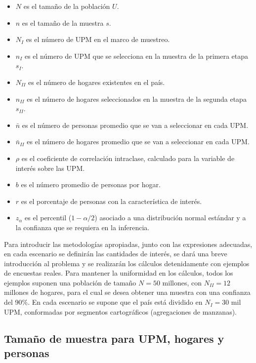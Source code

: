 \documentclass[
  10pt,
  spanish,
]{book}
\providecommand{\tightlist}{%
  \setlength{\itemsep}{0pt}\setlength{\parskip}{0pt}}
\begin{document}
\begin{itemize}
\tightlist
\item
  \(N\) es el tamaño de la población \(U\).
\item
  \(n\) es el tamaño de la muestra \(s\).
\item
  \(N_{I}\) es el número de UPM en el marco de muestreo.
\item
  \(n_{I}\) es el número de UPM que se selecciona en la muestra de la primera etapa \(s_I\).
\item
  \(N_{II}\) es el número de hogares existentes en el país.
\item
  \(n_{II}\) es el número de hogares seleccionados en la muestra de la segunda etapa \(s_{II}\).
\item
  \(\bar{n}\) es el número de personas promedio que se van a seleccionar en cada UPM.
\item
  \(\bar{n}_{II}\) es el número de hogares promedio que se van a seleccionar en cada UPM.
\item
  \(\rho\) es el coeficiente de correlación intraclase, calculado para la variable de interés sobre las UPM.
\item
  \(b\) es el número promedio de personas por hogar.
\item
  \(r\) es el porcentaje de personas con la característica de interés.
\item
  \(z_{\alpha}\) es el percentil (\(1- \alpha/2\)) asociado a una distribución normal estándar y a la confianza que se requiera en la inferencia.
\end{itemize}

Para introducir las metodologías apropiadas, junto con las expresiones adecuadas, en cada escenario se definirán las cantidades de interés, se dará una breve introducción al problema y se realizarán los cálculos detenidamente con ejemplos de encuestas reales. Para mantener la uniformidad en los cálculos, todos los ejemplos suponen una población de tamaño \(N=50\) millones, con \(N_{II} = 12\) millones de hogares, para el cual se desea obtener una muestra con una confianza del 90\%. En cada escenario se supone que el país está dividido en \(N_{I} =30\) mil UPM, conformadas por segmentos cartográficos (agregaciones de manzanas).

\hypertarget{tamauxf1o-de-muestra-para-upm-hogares-y-personas}{%
\subsection{Tamaño de muestra para UPM, hogares y personas}\label{tamauxf1o-de-muestra-para-upm-hogares-y-personas}}
\end{document}
